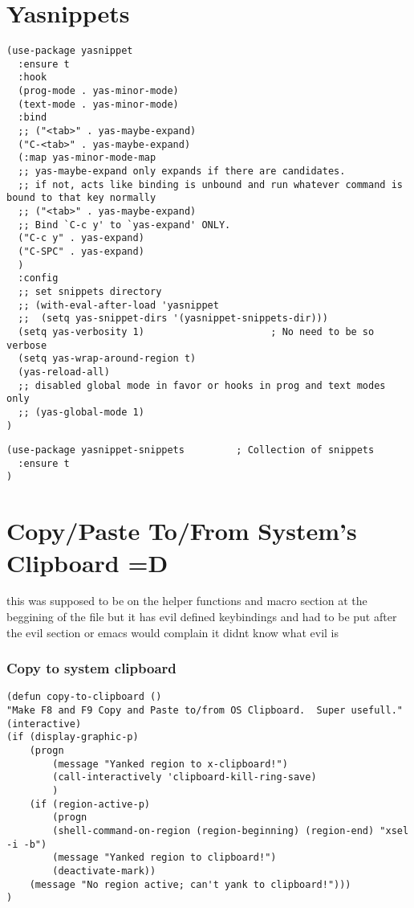\documentclass[11pt]{article}
\begin{document}
\section*{Yasnippets}
\label{sec:org9687edb}

\begin{verbatim}
(use-package yasnippet
  :ensure t
  :hook
  (prog-mode . yas-minor-mode)
  (text-mode . yas-minor-mode)
  :bind
  ;; ("<tab>" . yas-maybe-expand)
  ("C-<tab>" . yas-maybe-expand)
  (:map yas-minor-mode-map
  ;; yas-maybe-expand only expands if there are candidates.
  ;; if not, acts like binding is unbound and run whatever command is bound to that key normally
  ;; ("<tab>" . yas-maybe-expand)
  ;; Bind `C-c y' to `yas-expand' ONLY.
  ("C-c y" . yas-expand)
  ("C-SPC" . yas-expand)
  )
  :config
  ;; set snippets directory
  ;; (with-eval-after-load 'yasnippet
  ;;  (setq yas-snippet-dirs '(yasnippet-snippets-dir)))
  (setq yas-verbosity 1)                      ; No need to be so verbose
  (setq yas-wrap-around-region t)
  (yas-reload-all)
  ;; disabled global mode in favor or hooks in prog and text modes only
  ;; (yas-global-mode 1)
)
\end{verbatim}

\begin{verbatim}
(use-package yasnippet-snippets         ; Collection of snippets
  :ensure t
)
\end{verbatim}


\section*{Copy/Paste To/From System's Clipboard =D}
\label{sec:org762cebc}
this was supposed to be on the helper functions and macro section at the beggining of the file
but it has evil defined keybindings and had to be put after the evil section or emacs would complain it didnt know what evil is

\subsubsection*{Copy to system clipboard}
\label{sec:orgd91b9c7}

\begin{verbatim}
(defun copy-to-clipboard ()
"Make F8 and F9 Copy and Paste to/from OS Clipboard.  Super usefull."
(interactive)
(if (display-graphic-p)
    (progn
        (message "Yanked region to x-clipboard!")
        (call-interactively 'clipboard-kill-ring-save)
        )
    (if (region-active-p)
        (progn
        (shell-command-on-region (region-beginning) (region-end) "xsel -i -b")
        (message "Yanked region to clipboard!")
        (deactivate-mark))
    (message "No region active; can't yank to clipboard!")))
)
\end{verbatim}
\end{document}
